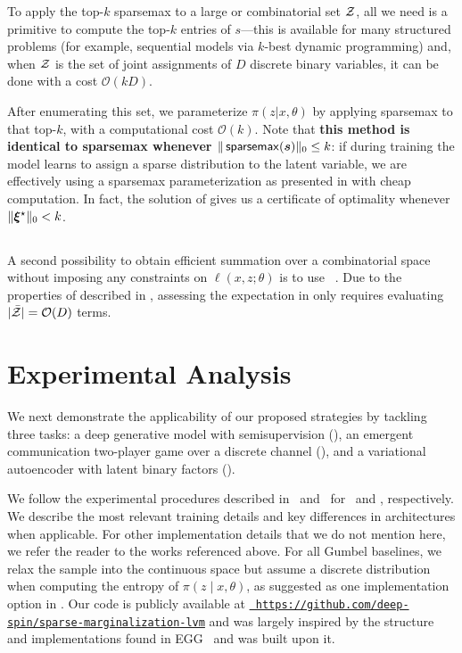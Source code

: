 To apply the top-$k$ sparsemax to a large or combinatorial set $\mathcal{Z}$,
all we need is a primitive to compute the top-$k$ entries of
$s$---this is available for many structured problems (for example,
sequential models via $k$-best dynamic programming) and, when $\mathcal{Z}$
is the set of joint assignments of $D$ discrete binary variables, it
can be done with a cost $\mathcal{O}(kD)$.

After enumerating this set, we parameterize $\pi(z|x,\theta)$ by
applying sparsemax to that top-$k$, with a
computational cost $\mathcal{O}(k)$. Note that {\bf this method is
        identical to sparsemax whenever $\|\operatorname*{\mathsf{sparsemax}}(\bm{s})\|_0 \le k$}: if
during training the model learns to assign a sparse distribution to
the latent variable, we are effectively using a sparsemax
parameterization as presented in  with cheap
computation. In fact, the solution of 
gives us a certificate of optimality whenever $\|\bm{\xi}^\star\|_0 < k$.

\subsection{\label{sec:smap}\smap}

A second possibility to obtain efficient summation over a
combinatorial space without imposing any constraints on $\ell(x, z;
    \theta)$ is to use \smap~\citep{niculae2018sparsemap, sparsemapcg}.
Due to the properties of \smap described in ,
assessing the expectation in  only requires evaluating
$|\bar{\mathcal{Z}}| = \mathcal{O}(D)$ terms.

\section{\label{sec:applications}Experimental Analysis}

We next demonstrate the applicability of our proposed strategies by
tackling three tasks: a deep generative model with semisupervision
(), an emergent communication two-player game over a
discrete channel (), and a variational autoencoder with
latent binary factors ().

We follow the experimental procedures described
in~\citep{RB19} and~\citep{Lazaridou2017} for~ and
, respectively. We describe the most relevant
training details and key differences in architectures when
applicable. For other implementation details that we do not mention
here, we refer the reader to the works referenced above. For all
Gumbel baselines, we relax the sample into the continuous space but
assume a discrete distribution when computing the entropy of $\pi(z
    \mid x, \theta)$, as suggested as one implementation option in
\citet{Concrete}. Our code is publicly available at
\href{https://github.com/deep-spin/sparse-marginalization-lvm}{\tt
    https://github.com/deep-spin/sparse-marginalization-lvm} and was
largely inspired by the structure and implementations found in
EGG~\citep{Kharitonov2019} and was built upon it.

